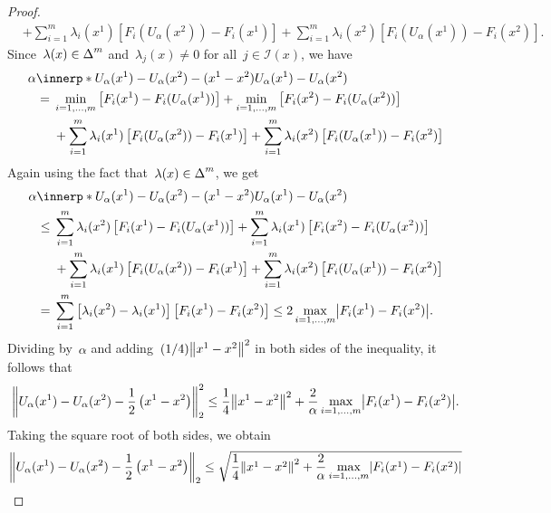 \documentclass[../../main]{subfiles}
\begin{document}
\begin{proof}
\begin{align}
           &+ \sum_{i = 1}^{m} \lambda_i(x^1) \left[ F_i(U_\alpha(x^2)) - F_i(x^1) \right] + \sum_{i = 1}^{m} \lambda_i(x^2) \left[ F_i(U_\alpha(x^1)) - F_i(x^2) \right]
    .\end{align}
    Since~$\lambda(x) \in \operatorname{\Delta}^m$ and~$\lambda_j(x) \neq 0$ for all~$j \in \mathcal{I}(x)$, we have
    \begin{align}
        \MoveEqLeft \alpha \innerp*{U_\alpha(x^1) - U_\alpha(x^2) - (x^1 - x^2)}{U_\alpha(x^1) - U_\alpha(x^2)} \\
        ={}& \min_{i = 1, \dots, m} \left[ F_i(x^1) - F_i(U_\alpha(x^1)) \right] + \min_{i = 1, \dots, m} \left[ F_i(x^2) - F_i(U_\alpha(x^2)) \right] \\
           &+ \sum_{i = 1}^{m} \lambda_i(x^1) \left[ F_i(U_\alpha(x^2)) - F_i(x^1) \right] + \sum_{i = 1}^{m} \lambda_i(x^2) \left[ F_i(U_\alpha(x^1)) - F_i(x^2) \right]
    \end{align}
    Again using the fact that~$\lambda(x) \in \operatorname{\Delta}^m$, we get
    \begin{align}
        \MoveEqLeft \alpha \innerp*{U_\alpha(x^1) - U_\alpha(x^2) - (x^1 - x^2)}{U_\alpha(x^1) - U_\alpha(x^2)} \\
        \le{}& \sum_{i = 1}^{m} \lambda_i(x^2) \left[ F_i(x^1) - F_i(U_\alpha(x^1)) \right] + \sum_{i = 1}^{m} \lambda_i(x^1) \left[ F_i(x^2) - F_i(U_\alpha(x^2)) \right] \\
           &+ \sum_{i = 1}^{m} \lambda_i(x^1) \left[ F_i(U_\alpha(x^2)) - F_i(x^1) \right] + \sum_{i = 1}^{m} \lambda_i(x^2) \left[ F_i(U_\alpha(x^1)) - F_i(x^2) \right] \\
        ={}& \sum_{i = 1}^{m} \left[ \lambda_i(x^2) - \lambda_i(x^1) \right] \left[ F_i(x^1) - F_i(x^2) \right] 
        \le 2 \max_{i = 1, \dots, m} \abs*{F_i(x^1) - F_i(x^2)}
    .\end{align}
    Dividing by~$\alpha$ and adding~$(1 / 4) \norm*{x^1 - x^2}^2$ in both sides of the inequality, it follows that
    \begin{equation}
        \norm*{U_\alpha(x^1) - U_\alpha(x^2) - \frac{1}{2} \left( x^1 - x^2 \right) }_2^2 \le \frac{1}{4} \norm*{x^1 - x^2}^2 + \frac{2}{\alpha} \max_{i = 1, \dots, m} \abs*{F_i(x^1) - F_i(x^2)}
    .\end{equation} 
    Taking the square root of both sides, we obtain
    \begin{equation}
        \norm*{U_\alpha(x^1) - U_\alpha(x^2) - \frac{1}{2} \left( x^1 - x^2 \right) }_2 \le \sqrt{\frac{1}{4} \norm*{x^1 - x^2}^2 + \frac{2}{\alpha} \max_{i = 1, \dots, m} \abs*{F_i(x^1) - F_i(x^2)}}

\end{equation}
\end{proof}
\end{document}
